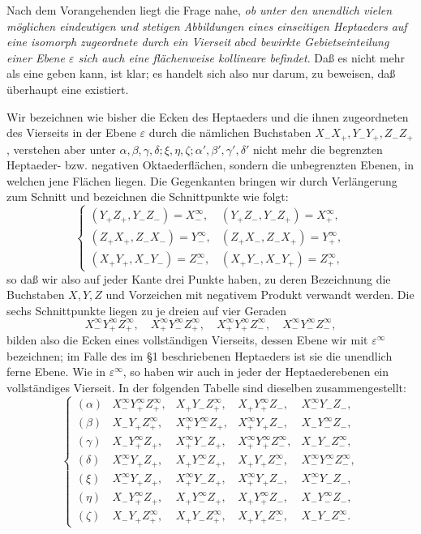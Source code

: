 \documentclass[11pt,a4paper]{article}
\begin{document}
Nach dem Vorangehenden liegt die Frage nahe, \emph{ob unter den unendlich vielen m\"oglichen eindeutigen und stetigen Abbildungen eines einseitigen Heptaeders auf eine isomorph zugeordnete durch ein Vierseit $abcd$ bewirkte Gebietseinteilung einer Ebene $\varepsilon$ sich auch eine fl\"achenweise kollineare befindet}. Da\ss{} es nicht mehr als eine geben kann, ist klar; es handelt sich also nur darum, zu beweisen, da\ss{} \"uberhaupt eine existiert.

Wir bezeichnen wie bisher die Ecken des Heptaeders und die ihnen zugeordneten des Vierseits in der Ebene $\varepsilon$ durch die n\"amlichen Buchstaben $X_-X_+,Y_-Y_+,Z_-Z_+$, verstehen aber unter $\alpha,\beta,\gamma,\delta;\xi,\eta,\zeta;\alpha',\beta',\gamma',\delta'$ nicht mehr die begrenzten Heptaeder- bzw. negativen Oktaederfl\"achen, sondern die unbegrenzten Ebenen, in welchen jene Fl\"achen liegen. Die Gegenkanten bringen wir durch Verl\"angerung zum Schnitt und bezeichnen die Schnittpunkte wie folgt:
\[
\left\{
\begin{array}{ll}
(Y_+Z_+,Y_-Z_-)=X_-^\infty,&(Y_+Z_-,Y_-Z_+)=X_+^\infty,\\
(Z_+X_+,Z_-X_-)=Y_-^\infty,&(Z_+X_-,Z_-X_+)=Y_+^\infty,\\
(X_+Y_+,X_-Y_-)=Z_-^\infty,&(X_+Y_-,X_-Y_+)=Z_+^\infty,
\end{array}\right.\tag{3}
\]
so da\ss{} wir also auf jeder Kante drei Punkte haben, zu deren Bezeichnung die Buchstaben $X,Y,Z$ und Vorzeichen mit negativem Produkt verwandt werden. Die sechs Schnittpunkte liegen zu je dreien auf vier Geraden
\[
 X_-^\infty Y_+^\infty Z_+^\infty,
 \quad X_+^\infty Y_-^\infty Z_+^\infty,
 \quad X_+^\infty Y_+^\infty Z_-^\infty,
 \quad X_-^\infty Y_-^\infty Z_-^\infty,
\]
bilden also die Ecken eines vollst\"andigen Vierseits, dessen Ebene wir mit $\varepsilon^\infty$ bezeichnen; im Falle des im \S 1 beschriebenen Heptaeders ist sie die unendlich ferne Ebene. Wie in $\varepsilon^\infty$, so haben wir auch in jeder der Heptaederebenen ein vollst\"andiges Vierseit. In der folgenden Tabelle sind dieselben zusammengestellt:
\[
\renewcommand{\arraystretch}{1.15}
\left\{
\begin{array}{lllll}
(\alpha)&X_-^\infty Y_+^\infty Z_+^\infty,&X_+Y_-Z_+^\infty,&X_+Y_+^\infty Z_-,&X_-^\infty Y_-Z_-,\\
(\beta)&X_-Y_+Z_+^\infty,&X_+^\infty Y_-^\infty Z_+,&X_+^\infty Y_+Z_-,&X_-Y_-^\infty Z_-,\\
(\gamma)&X_-Y_+^\infty Z_+,&X_+^\infty Y_-Z_+,&X_+^\infty Y_+^\infty Z_-^\infty,&X_-Y_-Z_-^\infty,\\
(\delta)&X_-^\infty Y_+Z_+,&X_+Y_-^\infty Z_+,&X_+Y_+Z_-^\infty,&X_-^\infty Y_-^\infty Z_-^\infty,\\
(\xi)&X_-^\infty Y_+Z_+,&X_+^\infty Y_-Z_+,&X_+^\infty Y_+Z_-,&X_-^\infty Y_-Z_-,\\
(\eta)&X_-Y_+^\infty Z_+,&X_+Y_-^\infty Z_+,&X_+Y_+^\infty Z_-,&X_-Y_-^\infty Z_-,\\
(\zeta)&X_-Y_+Z_+^\infty,&X_+Y_-Z_+^\infty,&X_+Y_+Z_-^\infty,&X_-Y_-Z_-^\infty.
\end{array}\right.\tag{4}
\]
\end{document}

